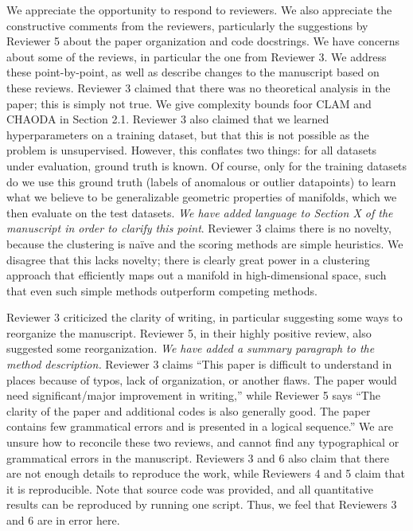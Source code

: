 \documentclass{article}
\begin{document}
We appreciate the opportunity to respond to reviewers.
We also appreciate the constructive comments from the reviewers, particularly the suggestions by Reviewer 5 about the paper organization and code docstrings.
We have concerns about some of the reviews, in particular the one from Reviewer 3.
We address these point-by-point, as well as describe changes to the manuscript based on these reviews.
Reviewer 3 claimed that there was no theoretical analysis in the paper; this is simply not true.
We give complexity bounds foor CLAM and CHAODA in Section 2.1.
Reviewer 3 also claimed that we learned hyperparameters on a training dataset, but that this is not possible as the problem is unsupervised.
However, this conflates two things: for all datasets under evaluation, ground truth is known.
Of course, only for the training datasets do we use this ground truth (labels of anomalous or outlier datapoints) to learn what we believe to be generalizable geometric properties of manifolds, which we then evaluate on the test datasets.
\emph{We have added language to Section X of the manuscript in order to clarify this point}.
Reviewer 3 claims there is no novelty, because the clustering is na\"ive and the scoring methods are simple heuristics.
We disagree that this lacks novelty; there is clearly great power in a clustering approach that efficiently maps out a manifold in high-dimensional space, such that even such simple methods outperform competing methods.

Reviewer 3 criticized the clarity of writing, in particular suggesting some ways to reorganize the manuscript.
Reviewer 5, in their highly positive review, also suggested some reorganization.
\emph{We have added a summary paragraph to the method description.}
Reviewer 3 claims ``This paper is difficult to understand in places because of typos, lack of organization, or another flaws. The paper would need significant/major improvement in writing,'' while Reviewer 5 says ``The clarity of the paper and additional codes is also generally good. The paper contains few grammatical errors and is presented in a logical sequence.''
We are unsure how to reconcile these two reviews, and cannot find any typographical or grammatical errors in the manuscript.
Reviewers 3 and 6 also claim that there are not enough details to reproduce the work, while Reviewers 4 and 5 claim that it is reproducible.
Note that source code was provided, and all quantitative results can be reproduced by running one script.
Thus, we feel that Reviewers 3 and 6 are in error here.
\end{document}
